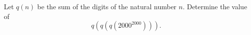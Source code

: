 Let $q(n)$ be the sum of the digits of the natural number $n$.
Determine the value of
$$q(q(q(2000^2000))).$$
